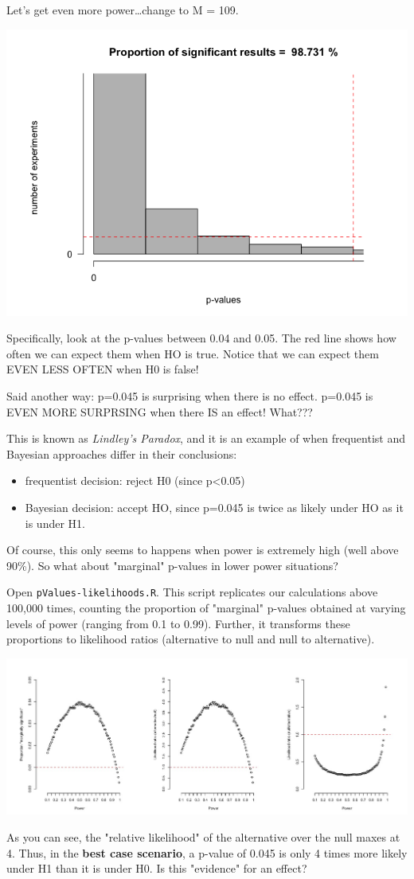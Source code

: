 \documentclass[11pt]{article}
\begin{document}
Let's get even more power\ldots{}change to M = 109.

\includegraphics[width=.9\linewidth]{figures/lindley6.png}

Specifically, look at the p-values between 0.04 and 0.05.  The red line shows how often we can expect them when HO is true.  Notice that we can expect them EVEN LESS OFTEN when H0 is false!

Said another way:  p=0.045 is surprising when there is no effect.  p=0.045 is EVEN MORE SURPRSING when there IS an effect!  What???

This is known as \emph{Lindley's Paradox}, and it is an example of when frequentist and Bayesian approaches differ in their conclusions:
\begin{itemize}
\item frequentist decision: reject H0 (since p<0.05)
\item Bayesian decision: accept HO, since p=0.045 is twice as likely under HO as it is under H1.
\end{itemize}

Of course, this only seems to happens when power is extremely high (well above 90\%).  So what about "marginal" p-values in lower power situations?

Open \verb~pValues-likelihoods.R~.  This script replicates our calculations above 100,000 times, counting the proportion of "marginal" p-values obtained at varying levels of power (ranging from 0.1 to 0.99).  Further, it transforms these proportions to likelihood ratios (alternative to null and null to alternative).

\includegraphics[width=.9\linewidth]{figures/likelihoods.png}

As you can see, the "relative likelihood" of the alternative over the null maxes at 4.  Thus, in the \textbf{best case scenario}, a p-value of 0.045 is only 4 times more likely under H1 than it is under H0.  Is this "evidence" for an effect? 
\end{document}
